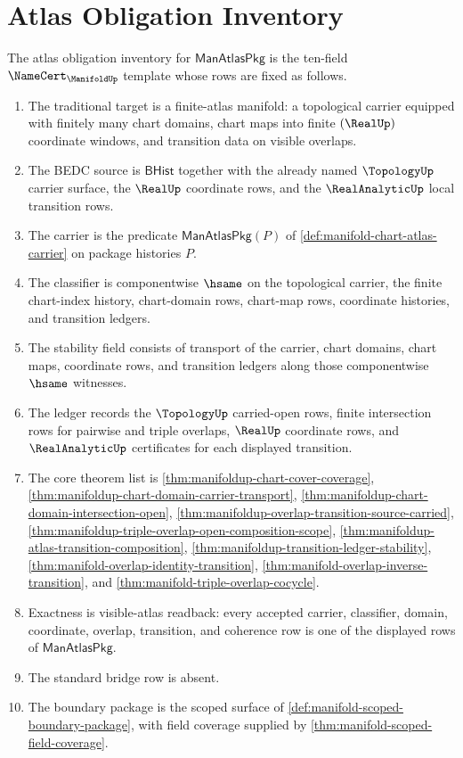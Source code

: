 \section{Atlas Obligation Inventory}
\label{sec:manifold-atlas-obligation-inventory}

\begin{definition}
\label{def:manifold-atlas-obligation-inventory}
The atlas obligation inventory for $\mathsf{ManAtlasPkg}$ is the ten-field
$\NameCert_{\ManifoldUp}$ template whose rows are fixed as follows.
\begin{enumerate}
\item The traditional target is a finite-atlas manifold: a topological carrier
equipped with finitely many chart domains, chart maps into finite
$(\RealUp)$ coordinate windows, and transition data on visible overlaps.
\item The BEDC source is $\mathsf{BHist}$ together with the already named
$\TopologyUp$ carrier surface, the $\RealUp$ coordinate rows, and the
$\RealAnalyticUp$ local transition rows.
\item The carrier is the predicate $\mathsf{ManAtlasPkg}(P)$ of
\autoref{def:manifold-chart-atlas-carrier} on package histories $P$.
\item The classifier is componentwise $\hsame$ on the topological carrier, the
finite chart-index history, chart-domain rows, chart-map rows, coordinate
histories, and transition ledgers.
\item The stability field consists of transport of the carrier, chart domains,
chart maps, coordinate rows, and transition ledgers along those componentwise
$\hsame$ witnesses.
\item The ledger records the $\TopologyUp$ carried-open rows, finite
intersection rows for pairwise and triple overlaps, $\RealUp$ coordinate rows,
and $\RealAnalyticUp$ certificates for each displayed transition.
\item The core theorem list is
\autoref{thm:manifoldup-chart-cover-coverage},
\autoref{thm:manifoldup-chart-domain-carrier-transport},
\autoref{thm:manifoldup-chart-domain-intersection-open},
\autoref{thm:manifoldup-overlap-transition-source-carried},
\autoref{thm:manifoldup-triple-overlap-open-composition-scope},
\autoref{thm:manifoldup-atlas-transition-composition},
\autoref{thm:manifoldup-transition-ledger-stability},
\autoref{thm:manifold-overlap-identity-transition},
\autoref{thm:manifold-overlap-inverse-transition}, and
\autoref{thm:manifold-triple-overlap-cocycle}.
\item Exactness is visible-atlas readback: every accepted carrier, classifier,
domain, coordinate, overlap, transition, and coherence row is one of the
displayed rows of $\mathsf{ManAtlasPkg}$.
\item The standard bridge row is absent.
\item The boundary package is the scoped surface of
\autoref{def:manifold-scoped-boundary-package}, with field coverage supplied
by \autoref{thm:manifold-scoped-field-coverage}.
\end{enumerate}
\end{definition}

